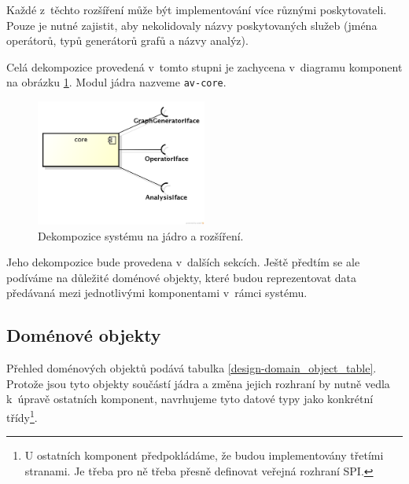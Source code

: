 Každé z~těchto rozšíření může být implementování více různými poskytovateli. Pouze je nutné zajistit, aby nekolidovaly názvy poskytovaných služeb (jména operátorů, typů generátorů grafů a názvy analýz).

Celá dekompozice provedená v~tomto stupni je zachycena v~diagramu komponent na obrázku \ref{design-modules}. Modul jádra nazveme \verb+av-core+.
\begin{figure}[h!]
  \centering
  \includegraphics[width=0.5\textwidth]{./uml/archval_module_cmp.png}
  \caption{Dekompozice systému na jádro a rozšíření.\label{design-modules}}
\end{figure}
Jeho dekompozice bude provedena v~dalších sekcích. Ještě předtím se ale podíváme na důležité doménové objekty, které budou reprezentovat data předávaná mezi jednotlivými komponentami v~rámci systému.

\subsection{Doménové objekty}
\label{design-domain_objects}

Přehled doménových objektů podává tabulka \ref{design-domain_object_table}. Protože jsou tyto objekty součástí jádra a změna jejich rozhraní by nutně vedla k~úpravě ostatních komponent, navrhujeme tyto datové typy jako konkrétní třídy\footnote{U ostatních komponent předpokládáme, že budou implementovány třetími stranami. Je třeba pro ně třeba přesně definovat veřejná rozhraní SPI.}.

